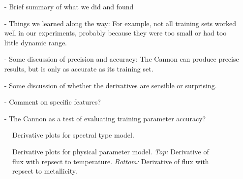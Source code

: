 \documentclass[modern]{aastex62}
\begin{document}
\begin{enumerate}
\item[-] Brief summary of what we did and found

\item[-] Things we learned along the way: For example, not all training sets worked well in our experiments, probably because they were too small or had too little dynamic range.

\item[-] Some discussion of precision and accuracy: The Cannon can produce precise results, but is only as accurate as its training set. 

\item[-] Some discussion of whether the derivatives are sensible or surprising. \color{red}{Add derivative plots.}\color{black}

\item[-] Comment on specific features? \color{red}{Can easily plot some line lists, but not sure where to go with the analysis... What features are important for M dwarfs? Compare derivative plots of specific lines between theory-trained models and data-trained models?}\color{black}

\item[-] The Cannon as a test of evaluating training parameter accuracy? 
\end{enumerate}

\begin{figure}[ht]
\caption{Derivative plots for spectral type model.} \label{fig:west_derivative}
\end{figure}

\begin{figure}[ht]
\caption{Derivative plots for physical parameter model. \textit{Top:} Derivative of flux with repsect to temperature. \textit{Bottom:} Derivative of flux with repsect to metallicity.} \label{fig:mann_derivative}
\end{figure}


\clearpage


\end{document}

